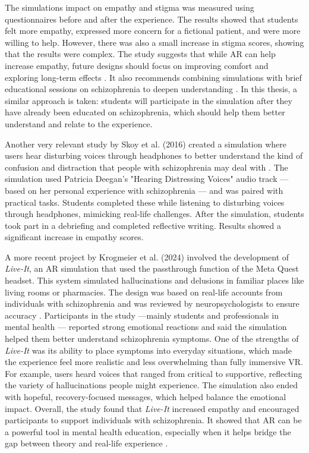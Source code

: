 The simulations impact on empathy and stigma was measured using questionnaires before and after the experience. The results showed that students felt more empathy, expressed more concern for a fictional patient, and were more willing to help. However, there was also a small increase in stigma scores, showing that the results were complex. The study suggests that while AR can help increase empathy, future designs should focus on improving comfort and exploring long-term effects \cite{Silva2017}. It also recommends combining simulations with brief educational sessions on schizophrenia to deepen understanding \cite{Silva2017}. In this thesis, a similar approach is taken: students will participate in the simulation after they have already been educated on schizophrenia, which should help them better understand and relate to the experience.

Another very relevant study by Skoy et al. (2016) created a simulation where users hear disturbing voices through headphones to better understand the kind of confusion and distraction that people with schizophrenia may deal with \cite{Skoy2016}. The simulation used Patricia Deegan's "Hearing Distressing Voices" audio track — based on her personal experience with schizophrenia — and was paired with practical tasks. Students completed these while listening to disturbing voices through headphones, mimicking real-life challenges. After the simulation, students took part in a debriefing and completed reflective writing. Results showed a significant increase in empathy scores.

A more recent project by Krogmeier et al. (2024) involved the development of \textit{Live-It}, an AR simulation that used the passthrough function of the Meta Quest headset. This system simulated hallucinations and delusions in familiar places like living rooms or pharmacies. The design was based on real-life accounts from individuals with schizophrenia and was reviewed by neuropsychologists to ensure accuracy \cite{Krogmeier2024}. Participants in the study  —mainly students and professionals in mental health — reported strong emotional reactions and said the simulation helped them better understand schizophrenia symptoms. One of the strengths of \textit{Live-It} was its ability to place symptoms into everyday situations, which made the experience feel more realistic and less overwhelming than fully immersive VR. For example, users heard voices that ranged from critical to supportive, reflecting the variety of hallucinations people might experience. The simulation also ended with hopeful, recovery-focused messages, which helped balance the emotional impact. Overall, the study found that \textit{Live-It} increased empathy and encouraged participants to support individuals with schizophrenia. It showed that AR can be a powerful tool in mental health education, especially when it helps bridge the gap between theory and real-life experience \cite{Krogmeier2024}.

